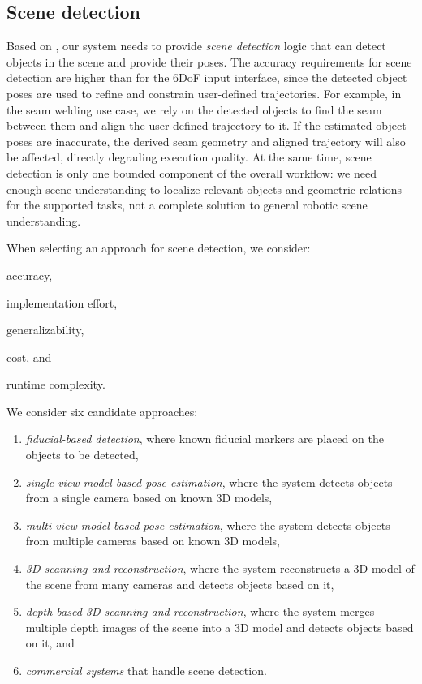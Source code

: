 \subsection{Scene detection} \label{subsec:ch2_analysis_scene_detection}

Based on , our system needs to provide \emph{scene detection} logic that can detect objects in the scene and provide their poses. The accuracy requirements for scene detection are higher than for the 6DoF input interface, since the detected object poses are used to refine and constrain user-defined trajectories. For example, in the seam welding use case, we rely on the detected objects to find the seam between them and align the user-defined trajectory to it. If the estimated object poses are inaccurate, the derived seam geometry and aligned trajectory will also be affected, directly degrading execution quality. At the same time, scene detection is only one bounded component of the overall workflow: we need enough scene understanding to localize relevant objects and geometric relations for the supported tasks, not a complete solution to general robotic scene understanding.

When selecting an approach for scene detection, we consider:
\begin{enumerate*}[label=(\roman*)]
    \item accuracy,
    \item implementation effort,
    \item generalizability,
    \item cost, and
    \item runtime complexity.
\end{enumerate*}

We consider six candidate approaches:
\begin{enumerate}[label=(\roman*)]
    \item \emph{fiducial-based detection}, where known fiducial markers are placed on the objects to be detected,
    \item \emph{single-view model-based pose estimation}, where the system detects objects from a single camera based on known 3D models, \label{req:single_view_model_based_pose_estimation}
    \item \emph{multi-view model-based pose estimation}, where the system detects objects from multiple cameras based on known 3D models, \label{req:multi_view_model_based_pose_estimation}
    \item \emph{3D scanning and reconstruction}, where the system reconstructs a 3D model of the scene from many cameras and detects objects based on it, \label{req:3D_scanning_and_reconstruction}
    \item \emph{depth-based 3D scanning and reconstruction}, where the system merges multiple depth images of the scene into a 3D model and detects objects based on it, and \label{req:depth_based_3D_scanning_and_reconstruction}
    \item \emph{commercial systems} that handle scene detection.
\end{enumerate}

